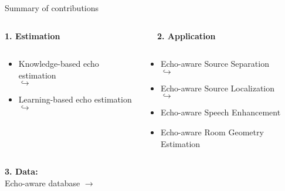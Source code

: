 \begin{frame}{Summary of contributions}
    \vfill
    \begin{columns}[T,onlytextwidth]
        \begin{column}{0.48\textwidth}
            \centering
            \textbf{1. Estimation}
        \end{column}
        \begin{column}{0.48\textwidth}
            \centering
            \textbf{2. Application}
        \end{column}
    \end{columns}
    \begin{columns}[T]
        \begin{column}{0.48\textwidth}
            \begin{itemize}
                \item Knowledge-based echo estimation
                \\$\hookrightarrow$ \blaster
                \item Learning-based echo estimation
                \\$\hookrightarrow$ \lantern
            \end{itemize}
        \end{column}
        \begin{column}{0.48\textwidth}
            \begin{itemize}
                \item Echo-aware Source Separation
                \\$\hookrightarrow$ \separake
                \item Echo-aware Source Localization
                \\$\hookrightarrow$ \mirage
                \item Echo-aware Speech Enhancement
                \item Echo-aware Room Geometry Estimation
            \end{itemize}
        \end{column}
    \end{columns}
    \begin{center}
        \textbf{3. Data:}
        \\Echo-aware database $\rightarrow$ \dechorate
    \end{center}
\end{frame}

